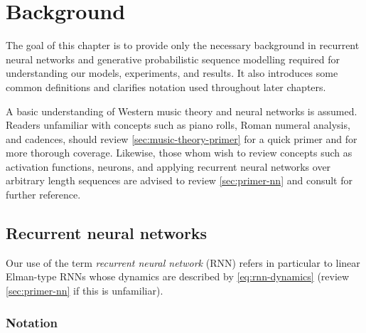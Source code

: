 \chapter{Background}

\ifpdf
    \graphicspath{{Chapter2/Figs/Raster/}{Chapter2/Figs/PDF/}{Chapter2/Figs/}}
\else
    \graphicspath{{Chapter2/Figs/Vector/}{Chapter2/Figs/}}
\fi

The goal of this chapter is to provide only the necessary background in
recurrent neural networks and generative probabilistic sequence modelling
required for understanding our models, experiments, and results. It also
introduces some common definitions and clarifies notation used throughout later chapters.

A basic understanding of Western music theory and neural networks is assumed.
Readers unfamiliar with concepts such as piano rolls, Roman numeral analysis,
and cadences, should review \vref{sec:music-theory-primer} for a quick primer
and \citet{piston1978harmony,denny1960oxford} for more thorough coverage.
Likewise, those whom wish to review concepts such as activation functions,
neurons, and applying recurrent neural networks over arbitrary length sequences
are advised to review \vref{sec:primer-nn} and consult
\citet{bengio2009learning} for further reference.

\section{Recurrent neural networks}\label{sec:bg-rnn}

Our use of the term \emph{recurrent neural network} (RNN) refers in particular
to linear Elman-type RNNs \citep{elman1990finding} whose dynamics are described
by \vref{eq:rnn-dynamics} (review \cref{sec:primer-nn} if this is unfamiliar).

\subsection{Notation}


